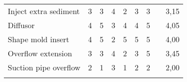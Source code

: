 \begin{table}[ht]
\begin{adjustbox}{max width=\textwidth}
\begin{tabular}{lcccccccc}
\multicolumn{1}{|l|}{Inject extra sediment}   & \multicolumn{1}{c|}{3}                     & \multicolumn{1}{c|}{3}                  & \multicolumn{1}{c|}{4}                               & \multicolumn{1}{c|}{2}                        & \multicolumn{1}{c|}{3}                          & \multicolumn{1}{c|}{3}                         & \multicolumn{1}{c|}{}          & \multicolumn{1}{c|}{3,15}           \\ \cline{1-7} \cline{9-9} 
\multicolumn{1}{|l|}{Diffusor}                & \multicolumn{1}{c|}{4}                     & \multicolumn{1}{c|}{5}                  & \multicolumn{1}{c|}{3}                               & \multicolumn{1}{c|}{4}                        & \multicolumn{1}{c|}{4}                          & \multicolumn{1}{c|}{5}                         & \multicolumn{1}{c|}{}          & \multicolumn{1}{c|}{\cellcolor{green}4,05}           \\ \cline{1-7} \cline{9-9} 
\multicolumn{1}{|l|}{Shape mold insert}       & \multicolumn{1}{c|}{4}                     & \multicolumn{1}{c|}{5}                  & \multicolumn{1}{c|}{2}                               & \multicolumn{1}{c|}{5}                        & \multicolumn{1}{c|}{5}                          & \multicolumn{1}{c|}{5}                         & \multicolumn{1}{c|}{}          & \multicolumn{1}{c|}{\cellcolor{green}4,00}           \\ \cline{1-7} \cline{9-9} 
\multicolumn{1}{|l|}{Overflow extension}      & \multicolumn{1}{c|}{3}                     & \multicolumn{1}{c|}{3}                  & \multicolumn{1}{c|}{4}                               & \multicolumn{1}{c|}{2}                        & \multicolumn{1}{c|}{3}                          & \multicolumn{1}{c|}{5}                         & \multicolumn{1}{c|}{}          & \multicolumn{1}{c|}{3,45}           \\ \cline{1-7} \cline{9-9} 
\multicolumn{1}{|l|}{Suction pipe overflow}   & \multicolumn{1}{c|}{2}                     & \multicolumn{1}{c|}{1}                  & \multicolumn{1}{c|}{3}                               & \multicolumn{1}{c|}{1}                        & \multicolumn{1}{c|}{2}                          & \multicolumn{1}{c|}{2}                         & \multicolumn{1}{c|}{}          & \multicolumn{1}{c|}{2,00}           \\ \cline{1-7} \cline{9-9} 
\multicolumn{1}{c}{}                          &                                            &                                         &                                                      &                                               &                                                 &                                                &                                &                                     \\ \cline{1-7} \cline{9-9} 

\end{tabular}
\end{adjustbox}
\end{table}
